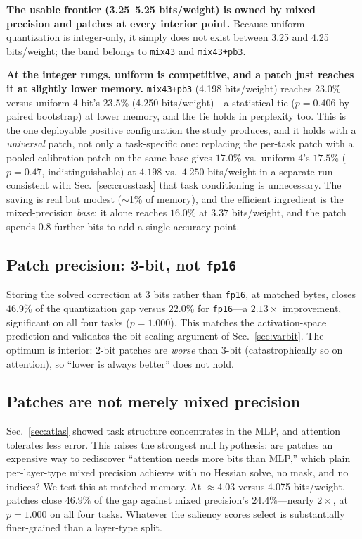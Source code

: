 \documentclass[manuscript, screen, review]{jair}
\newcommand{\bpw}{bits/weight}
\newcommand{\code}[1]{\texttt{#1}}
\begin{document}
\textbf{The usable frontier (3.25--5.25 \bpw{}) is owned by mixed precision and
patches at every interior point.} Because uniform quantization is integer-only,
it simply does not exist between 3.25 and 4.25 \bpw{}; the band belongs to
\code{mix43} and \code{mix43+pb3}.

\textbf{At the integer rungs, uniform is competitive, and a patch just reaches
it at slightly lower memory.} \code{mix43+pb3} (4.198 \bpw{}) reaches 23.0\%
versus uniform 4-bit's 23.5\% (4.250 \bpw{})---a statistical tie ($p{=}0.406$
by paired bootstrap) at lower memory, and the tie holds in perplexity too. This
is the one deployable positive configuration the study produces, and it holds
with a \emph{universal} patch, not only a task-specific one: replacing the
per-task patch with a pooled-calibration patch on the same base gives $17.0\%$
vs.\ uniform-4's $17.5\%$ ($p{=}0.47$, indistinguishable) at $4.198$ vs.\ $4.250$
\bpw{} in a separate run---consistent with Sec.~\ref{sec:crosstask} that task
conditioning is unnecessary. The saving is real but modest ($\sim$1\% of
memory), and the efficient ingredient is the mixed-precision \emph{base}: it
alone reaches $16.0\%$ at $3.37$ \bpw{}, and the patch spends $0.8$ further
bits to add a single accuracy point.

\subsection{Patch precision: 3-bit, not \code{fp16}}
\label{sec:precision}
Storing the solved correction at 3 bits rather than \code{fp16}, at matched
bytes, closes $46.9\%$ of the quantization gap versus $22.0\%$ for
\code{fp16}---a $2.13\times$ improvement, significant on all four tasks
($p{=}1.000$). This matches the activation-space prediction and validates the
bit-scaling argument of Sec.~\ref{sec:varbit}. The optimum is interior:
2-bit patches are \emph{worse} than 3-bit (catastrophically so on attention),
so ``lower is always better'' does not hold.

\subsection{Patches are not merely mixed precision}
\label{sec:vsmixed}
Sec.~\ref{sec:atlas} showed task structure concentrates in the MLP, and
attention tolerates less error. This raises the strongest null hypothesis: are
patches an expensive way to rediscover ``attention needs more bits than MLP,''
which plain per-layer-type mixed precision achieves with no Hessian solve, no
mask, and no indices? We test this at matched memory. At $\approx$4.03 versus
4.075 \bpw{}, patches close $46.9\%$ of the gap against mixed precision's
$24.4\%$---nearly $2\times$, at $p{=}1.000$ on all four tasks. Whatever the
saliency scores select is substantially finer-grained than a layer-type split.
\end{document}
